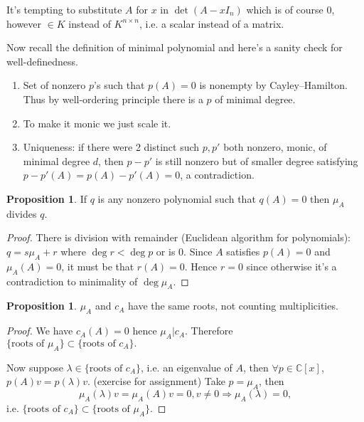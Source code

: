 \documentclass[a4paper]{article}
\theoremstyle{definition}
\newtheorem{prop}[defn]{Proposition}
\begin{document}
It's tempting to substitute $A$ for $x$ in $\det (A-xI_n)$ which is of course $0$, however $\in K$ instead of $K^{n\times n}$, i.e. a scalar instead of a matrix.

Now recall the definition of minimal polynomial and here's a sanity check for well-definedness.

\begin{enumerate}
	\item Set of nonzero $p$'s such that $p(A)=0$ is nonempty by Cayley–Hamilton. Thus by well-ordering principle there is a $p$ of minimal degree.
	\item To make it monic we just scale it.
	\item Uniqueness: if there were 2 distinct such $p,p'$ both nonzero, monic, of minimal degree $d$, then $p-p'$ is still nonzero but of smaller degree satisfying $p-p'(A)=p(A)-p'(A)=0$, a contradiction.
\end{enumerate}

\begin{prop}
	If $q$ is any nonzero polynomial such that $q(A)=0$ then $\mu_{A}$ divides $q$.
\end{prop}

\begin{proof}
	There is division with remainder (Euclidean algorithm for polynomials): $q=s\mu_{A}+r$ where $\deg r < \deg p$ or is 0. Since $A$ satisfies $p(A)=0$ and $\mu_{A}(A)=0$, it must be that $r(A)=0$. Hence $r=0$ since otherwise it's a contradiction to minimality of $\deg \mu_{A}$.
\end{proof}

\begin{prop}
	$\mu_{A}$ and $c_{A}$ have the same roots, not counting multiplicities.
\end{prop}

\begin{proof}
	We have $c_{A}(A)=0$ hence $\mu_{A} | c_{A}$. Therefore $\{\text{roots of }\mu_{A}\} \subset \{\text{roots of }c_{A}\} .$

	Now suppose $\lambda \in \{\text{roots of }c_{A}\}$, i.e. an eigenvalue of $A$, then $\forall p \in \mathbb C [x]$, $p(A)v=p(\lambda )v .$ (exercise for assignment) Take $p=\mu_{A}$, then
\[
\mu_{A}(\lambda) v = \mu_{A}(A)v=0, v\neq 0 \Rightarrow \mu_{A}(\lambda)=0,
\]
i.e. $\{\text{roots of }c_{A}\} \subset \{\text{roots of }\mu_{A}\} .$
\end{proof}
\end{document}
